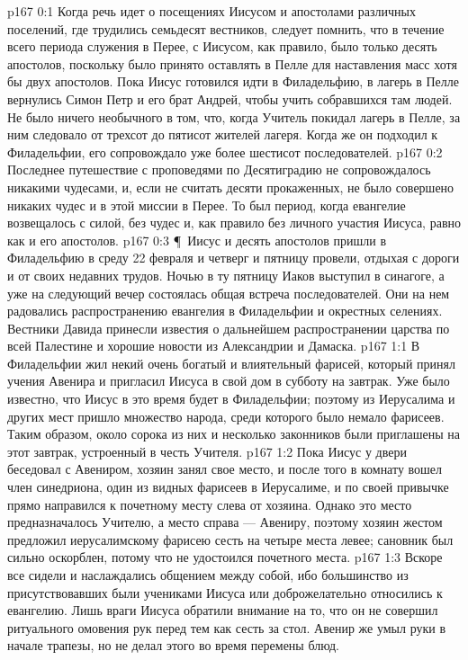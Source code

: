 \vs p167 0:1 Когда речь идет о посещениях Иисусом и апостолами различных поселений, где трудились семьдесят вестников, следует помнить, что в течение всего периода служения в Перее, с Иисусом, как правило, было только десять апостолов, поскольку было принято оставлять в Пелле для наставления масс хотя бы двух апостолов. Пока Иисус готовился идти в Филадельфию, в лагерь в Пелле вернулись Симон Петр и его брат Андрей, чтобы учить собравшихся там людей. Не было ничего необычного в том, что, когда Учитель покидал лагерь в Пелле, за ним следовало от трехсот до пятисот жителей лагеря. Когда же он подходил к Филадельфии, его сопровождало уже более шестисот последователей.
\vs p167 0:2 Последнее путешествие с проповедями по Десятиградию не сопровождалось никакими чудесами, и, если не считать десяти прокаженных, не было совершено никаких чудес и в этой миссии в Перее. То был период, когда евангелие возвещалось с силой, без чудес и, как правило без личного участия Иисуса, равно как и его апостолов.
\vs p167 0:3 \P\ Иисус и десять апостолов пришли в Филадельфию в среду 22 февраля и четверг и пятницу провели, отдыхая с дороги и от своих недавних трудов. Ночью в ту пятницу Иаков выступил в синагоге, а уже на следующий вечер состоялась общая встреча последователей. Они на нем радовались распространению евангелия в Филадельфии и окрестных селениях. Вестники Давида принесли известия о дальнейшем распространении царства по всей Палестине и хорошие новости из Александрии и Дамаска.
\vs p167 1:1 В Филадельфии жил некий очень богатый и влиятельный фарисей, который принял учения Авенира и пригласил Иисуса в свой дом в субботу на завтрак. Уже было известно, что Иисус в это время будет в Филадельфии; поэтому из Иерусалима и других мест пришло множество народа, среди которого было немало фарисеев. Таким образом, около сорока из них и несколько законников были приглашены на этот завтрак, устроенный в честь Учителя.
\vs p167 1:2 Пока Иисус у двери беседовал с Авениром, хозяин занял свое место, и после того в комнату вошел член синедриона, один из видных фарисеев в Иерусалиме, и по своей привычке прямо направился к почетному месту слева от хозяина. Однако это место предназначалось Учителю, а место справа --- Авениру, поэтому хозяин жестом предложил иерусалимскому фарисею сесть на четыре места левее; сановник был сильно оскорблен, потому что не удостоился почетного места.
\vs p167 1:3 Вскоре все сидели и наслаждались общением между собой, ибо большинство из присутствовавших были учениками Иисуса или доброжелательно относились к евангелию. Лишь враги Иисуса обратили внимание на то, что он не совершил ритуального омовения рук перед тем как сесть за стол. Авенир же умыл руки в начале трапезы, но не делал этого во время перемены блюд.
